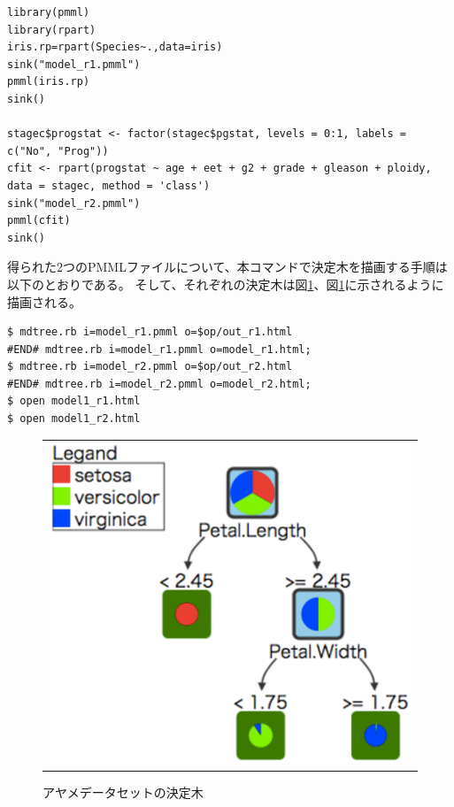 \begin{Verbatim}[baselinestretch=0.7,frame=single]
library(pmml)
library(rpart)
iris.rp=rpart(Species~.,data=iris)
sink("model_r1.pmml")
pmml(iris.rp)
sink()

stagec$progstat <- factor(stagec$pgstat, levels = 0:1, labels = c("No", "Prog"))
cfit <- rpart(progstat ~ age + eet + g2 + grade + gleason + ploidy, data = stagec, method = 'class')
sink("model_r2.pmml")
pmml(cfit)
sink()
\end{Verbatim}

得られた2つのPMMLファイルについて、本コマンドで決定木を描画する手順は以下のとおりである。
そして、それぞれの決定木は図\ref{fig:mdtree_tree_3}、図\ref{fig:mdtree_tree_3}に示されるように描画される。
\begin{Verbatim}[baselinestretch=0.7,frame=single]
$ mdtree.rb i=model_r1.pmml o=$op/out_r1.html
#END# mdtree.rb i=model_r1.pmml o=model_r1.html;
$ mdtree.rb i=model_r2.pmml o=$op/out_r2.html
#END# mdtree.rb i=model_r2.pmml o=model_r2.html;
$ open model1_r1.html
$ open model1_r2.html
\end{Verbatim}

\begin{figure}[htbp]
\begin{center}
\begin{tabular}{c}

\begin{minipage}{0.5\hsize}
\begin{center}
\includegraphics[scale=0.5]{figure/tree_3.eps}
\caption{アヤメデータセットの決定木\label{fig:mdtree_tree_3}}
\end{center}
\end{minipage}

\end{tabular}
\end{center}
\end{figure}

